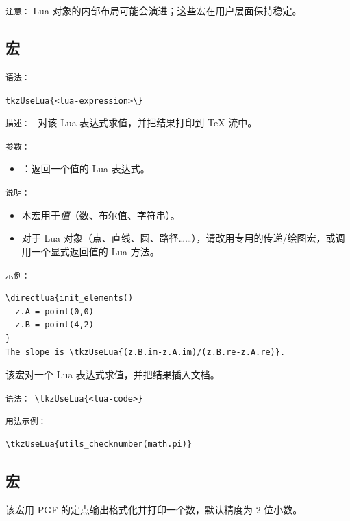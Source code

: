 \medskip
\texttt{注意：} Lua 对象的内部布局可能会演进；这些宏在用户层面保持稳定。

\subsection{宏 }
\label{subsec:tkzUseLua}

\medskip
\texttt{语法： }

\verb|tkzUseLua{<lua-expression>\}|


\medskip
\texttt{描述： } 对该 Lua 表达式求值，并把结果打印到 \TeX{} 流中。

\medskip
\texttt{参数： }
\begin{itemize}
\item {}：返回一个值的 Lua 表达式。
\end{itemize}

\medskip
\texttt{说明： }
\begin{itemize}
\item 本宏用于\emph{值}（数、布尔值、字符串）。
\item 对于 Lua 对象（点、直线、圆、路径……），请改用专用的传递/绘图宏，或调用一个显式返回值的 Lua 方法。
\end{itemize}

\texttt{示例： }
\begin{minipage}{.52\textwidth}
\begin{verbatim}
\directlua{init_elements()
  z.A = point(0,0)
  z.B = point(4,2)
}
The slope is \tkzUseLua{(z.B.im-z.A.im)/(z.B.re-z.A.re)}.
\end{verbatim}
\end{minipage}


该宏对一个 Lua 表达式求值，并把结果插入文档。


\texttt{语法： }\verb|\tkzUseLua{<lua-code>}|

\texttt{用法示例： }

\begin{mybox}
\begin{verbatim}
\tkzUseLua{utils_checknumber(math.pi)}
\end{verbatim}
\end{mybox}


\subsection{宏 }
该宏用 PGF 的定点输出格式化并打印一个数，默认精度为 2 位小数。

